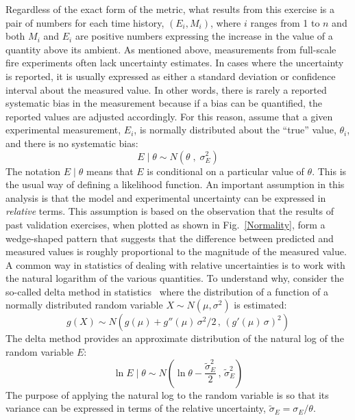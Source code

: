 \documentclass[fleqn,b5paper]{article}
\begin{document}
Regardless of the exact form of the metric, what results from this exercise is a pair of numbers for each time history, $(E_i,M_i)$, where $i$ ranges from 1 to $n$ and both $M_i$ and $E_i$ are positive numbers expressing the increase in the value of a quantity above its ambient. As mentioned above, measurements from full-scale fire experiments often lack uncertainty estimates. In cases where the uncertainty is reported, it is usually expressed as either a standard deviation or confidence interval about the measured value. In other words, there is rarely a reported systematic bias in the measurement because if a bias can be quantified, the reported values are adjusted accordingly. For this reason, assume that a given experimental measurement, $E_i$, is normally distributed about the ``true'' value, $\theta_i$, and there is no systematic bias:
\begin{equation}
   E \; | \; \theta \sim N(\theta \; , \; \sigma_E^2) \label{expunc}
\end{equation}
The notation $E \; | \; \theta$ means that $E$ is conditional on a particular value of $\theta$. This is the usual way of defining a likelihood function. An important assumption in this analysis is that the model and experimental uncertainty can be expressed in {\em relative} terms. This assumption is based on the observation that the results of past validation exercises, when plotted as shown in Fig.~\ref{Normality}, form a wedge-shaped pattern that suggests that the difference between predicted and measured values is roughly proportional to the magnitude of the measured value. A common way in statistics of dealing with relative uncertainties is to work with the natural logarithm of the various quantities. To understand why, consider the so-called delta method in statistics~\cite{Oehlert:1992} where the distribution of a function of a normally distributed random variable $X \sim N(\mu,\sigma^2)$ is estimated:
\[g(X) \sim N \left( g(\mu) + g''(\mu) \, \sigma^2/2 \, , \, (g'(\mu) \, \sigma)^2\right)\]
The delta method provides an approximate distribution of the natural log of the random variable $E$:
\begin{equation}
   \ln E \; | \; \theta \sim N \left( \ln \theta - \frac{\widetilde{\sigma}_E^2}{2} \, , \,\widetilde{\sigma}_E^2 \right) \label{eeq}
\end{equation}
The purpose of applying the natural log to the random variable is so that its variance can be expressed in terms of the relative uncertainty, $\widetilde{\sigma}_E=\sigma_E/\theta$. 
\end{document}
